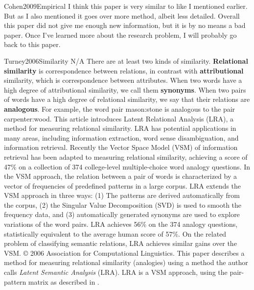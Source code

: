 \begin{review}{Cohen2009Empirical}
	I think this paper is very similar to \cite{Turney2010VsmOverview} like I mentioned earlier.
	But as I also mentioned it goes over more method, albeit less detailed.
	Overall this paper did not give me enough new information, but it is by no means a bad paper.
	Once I've learned more about the research problem, I will probably go back to this paper.
	
	
\end{review}\begin{review}
        {Turney2006Similarity}
        {N/A}
        {
        There are at least two kinds of similarity. 
        \textbf{Relational similarity} is correspondence between relations, in contrast with \textbf{attributional} similarity, which is correspondence between attributes.
        When two words have a high degree of attributional similarity, we call them \textbf{synonyms}. 
        When two pairs of words have a high degree of relational similarity, we say that their relations are \textbf{analogous}. 
        For example, the word pair mason:stone is analogous to the pair carpenter:wood. 
        This article introduces Latent Relational Analysis (LRA), a method for measuring relational similarity. LRA has potential applications in many areas, including information extraction, word sense disambiguation, and information retrieval. 
        Recently the Vector Space Model (VSM) of information retrieval has been adapted to measuring relational similarity, achieving a score of 47\% on a collection of 374 college-level multiple-choice word analogy questions. 
        In the VSM approach, the relation between a pair of words is characterized by a vector of frequencies of predefined patterns in a large corpus. 
        LRA extends the VSM approach in three ways: (1) The patterns are derived automatically from the corpus, (2) the Singular Value Decomposition (SVD) is used to smooth the frequency data, and (3) automatically generated synonyms are used to explore variations of the word pairs. 
        LRA achieves 56\% on the 374 analogy questions, statistically equivalent to the average human score of 57\%. 
        On the related problem of classifying semantic relations, LRA achieves similar gains over the VSM. 
        © 2006 Association for Computational Linguistics.
        }
    This paper describes a method for measuring relational similarity (analogies) using a method the author calls \emph{Latent Semantic Analysis} (LRA).
    LRA is a VSM approach, using the pair-pattern matrix as described in \cite{Turney2010VsmOverview}.
    

\end{review}
